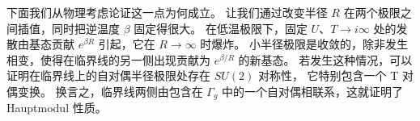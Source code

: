 
下面我们从物理考虑论证这一点为何成立。
让我们通过改变半径 $R$ 在两个极限之间插值，同时把逆温度 $\beta$ 固定得很大。
在低温极限下，固定 $U$、$T\to i\infty$ 处的发散由基态贡献 $e^{\beta R}$ 引起，它在 $R\to \infty$ 时爆炸。
小半径极限是收敛的，除非发生相变，使得在临界线的另一侧出现贡献为 $e^{\beta / R}$ 的新基态。
若发生这种情况，可以证明在临界线上的自对偶半径极限处存在 $SU(2)$ 对称性，
它特别包含一个 T 对偶变换。
换言之，临界线两侧由包含在 $\Gamma_g$ 中的一个自对偶相联系，这就证明了 Hauptmodul 性质。


